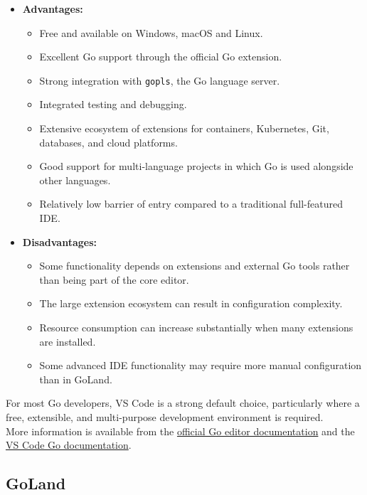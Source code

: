 \begin{itemize}
\item \textbf{Advantages:}
\begin{itemize}
\item Free and available on Windows, macOS and Linux.
\item Excellent Go support through the official Go extension.
\item Strong integration with \texttt{gopls}, the Go language server.
\item Integrated testing and debugging.
\item Extensive ecosystem of extensions for containers, Kubernetes, Git, databases, and cloud platforms.
\item Good support for multi-language projects in which Go is used alongside other languages.
\item Relatively low barrier of entry compared to a traditional full-featured IDE.
\end{itemize}

\item \textbf{Disadvantages:}
\begin{itemize}
    \item Some functionality depends on extensions and external Go tools rather than being part of the core editor.
    \item The large extension ecosystem can result in configuration complexity.
    \item Resource consumption can increase substantially when many extensions are installed.
    \item Some advanced IDE functionality may require more manual configuration than in GoLand.
\end{itemize}

\end{itemize}

For most Go developers, VS Code is a strong default choice, particularly where a free, extensible, and multi-purpose development environment is required.\\

More information is available from the
\href{https://go.dev/doc/editors}{official Go editor documentation}
and the
\href{https://code.visualstudio.com/docs/languages/go}{VS Code Go documentation}.

\subsection{GoLand}

